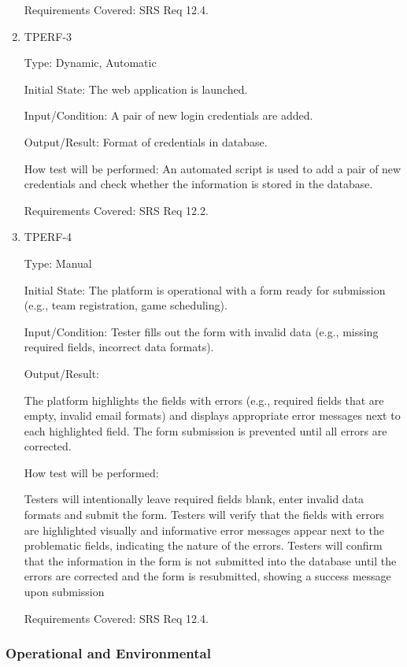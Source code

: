 \documentclass[12pt, titlepage]{article}
\begin{document}
\begin{enumerate}
Requirements Covered: SRS Req 12.4.

\item{TPERF-3\\}

Type: Dynamic, Automatic

Initial State: The web application is launched.

Input/Condition: A pair of new login credentials are added.

Output/Result: Format of credentials in database.

How test will be performed: An automated script is used to add a pair of
new credentials and check whether the information is stored in the database.

Requirements Covered: SRS Req 12.2.

\item{TPERF-4\\}

Type: Manual

Initial State: The platform is operational with a form ready for submission (e.g., team registration, game scheduling).

Input/Condition: Tester fills out the form with invalid data (e.g., missing required fields, incorrect data formats).

Output/Result:

The platform highlights the fields with errors (e.g., required fields that are empty, invalid email formats) and displays appropriate error messages  next to each highlighted field. The form submission is prevented until all errors are corrected.

How test will be performed:

Testers will intentionally leave required fields blank, enter invalid data formats  and submit the form. Testers will verify that the fields with errors are highlighted visually and informative error messages appear next to the problematic fields, indicating the nature of the errors. Testers will confirm that the information in the form is not submitted into the database until the errors are corrected and the form is resubmitted, showing a success message upon submission

Requirements Covered: SRS Req 12.4.

\end{enumerate}


\subsubsection{Operational and Environmental}
\end{document}
